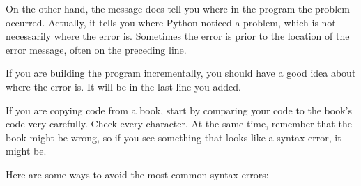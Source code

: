 \documentclass[10pt]{book}
\begin{document}
On the other hand, the message does tell you where in the program the
problem occurred.  Actually, it tells you where Python
noticed a problem, which is not necessarily where the error
is.  Sometimes the error is prior to the location of the error
message, often on the preceding line.

If you are building the program incrementally, you should have
a good idea about where the error is.  It will be in the last
line you added.

If you are copying code from a book, start by comparing
your code to the book's code very carefully.  Check every character.
At the same time, remember that the book might be wrong, so
if you see something that looks like a syntax error, it might be.

Here are some ways to avoid the most common syntax errors:
\end{document}
